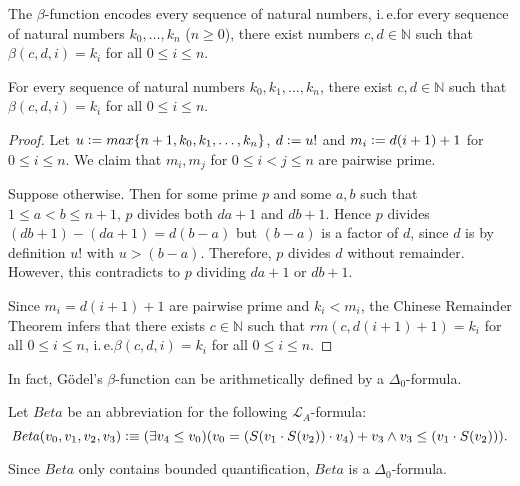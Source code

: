 The $\beta$-function encodes every sequence of natural numbers, i.\,e.\@ for every sequence of natural numbers $k_0, \ldots, k_n$ ($n \ge 0$), there exist numbers $c, d \in \mathbb{N}$ such that $\beta(c,d,i) = k_i$ for all $0 \le i \le n$. 
\begin{thm}
For every sequence of natural numbers $k_0, k_1, \ldots, k_n$, there exist $c,d \in \mathbb{N}$ such that $\beta(c,d,i) = k_i$ for all $0 \le i \le n$.
\end{thm}
\begin{proof}
Let $u \vcentcolon= max \lbrace n +1, k_0,k_1, \ldots, k_n \rbrace$, $d \vcentcolon= u!$ and $m_i \vcentcolon= d (i+1)+1$ for $0 \le i \le n$. We claim that $m_i, m_j$ for $0 \le i < j \le n$ are pairwise prime. 

Suppose otherwise. Then for some prime $p$ and some $a, b$ such that $1 \le a < b \le n+1$, $p$ divides both $da+1$ and $db+1$. Hence $p$ divides $(db+1) - (da+1) = d(b-a)$ but $(b-a)$ is a factor of $d$, since $d$ is by definition $u!$ with $u > (b-a)$. Therefore, $p$ divides $d$ without remainder. However, this contradicts to $p$ dividing $da+1$ or $db+1$.

Since $m_i = d(i+1)+1$ are pairwise prime and $k_i < m_i$, the Chinese Remainder Theorem infers that there exists $c \in \mathbb{N}$ such that $\mathit{rm}(c,d(i+1)+1) = k_i$ for all $0 \le i \le n$, i.\,e.\@ $\beta(c,d,i) = k_i$ for all $0 \le i \le n$.    
\end{proof}

In fact, G\"odel's $\beta$-function can be arithmetically defined by a $\Delta_0$-formula.

\begin{dfn}
Let $\mathit{Beta}$ be an abbreviation for the following $\mathcal{L}_A$-formula: \[ \mathit{Beta}(v_0,v_1,v_2,v_3)\vcentcolon \equiv ( \exists v_4 \le v_0 ) (v_0 = ( S(v_1 \cdot S(v_2)) \cdot v_4 ) + v_3 \wedge v_3 \le (v_1 \cdot S(v_2))).\]
\end{dfn}
Since $\mathit{Beta}$ only contains bounded quantification, $\mathit{Beta}$ is a $\Delta_0$-formula.

